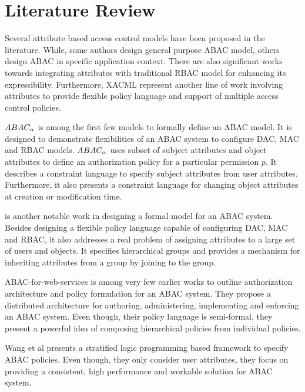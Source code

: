 	


\section{Literature Review}


Several attribute based access control models have been proposed in the literature. While, some authors design general purpose ABAC model, others design ABAC in specific application context. There are also significant works towards integrating attributes with traditional RBAC model for enhancing its expressibility. Furthermore, XACML represent another line of work involving attributes to provide flexible policy language and support of multiple access control policies.

$ABAC_\alpha${} \cite{abacAlpha} is among the first few models to formally define an ABAC model. It is designed to demonstrate flexibilities of an ABAC system to configure DAC, MAC and RBAC models. $ABAC_\alpha${} uses subset of subject attributes and object attributes to define  an authorization policy for a particular permission $p$. It describes a constraint language to specify subject attributes from user attributes. Furthermore, it also presents a constraint language for changing object attributes at  creation or modification time.

\hgabac{} \cite{hgabac} is another notable work in designing a formal model for an ABAC system. Besides designing a flexible policy language capable of  configuring DAC, MAC and RBAC, it also addresses a real problem of assigning attributes to a large set of users and objects. It specifies hierarchical groups and provides a mechanism for inheriting attributes from a group by joining to the group.

ABAC-for-web-services \cite{abac-for-web-service} is among very few earlier works to outline authorization architecture and policy formulation for an ABAC system. They propose a distributed architecture for authoring, administering, implementing and enforcing an ABAC system. Even though, their policy language is semi-formal, they present a powerful idea of composing hierarchical policies from individual policies.

Wang et al \cite{wang2004logic} presents a stratified logic programming based framework to specify ABAC policies. Even though, they only consider user attributes, they focus on providing a consistent, high performance and workable solution for ABAC system.



